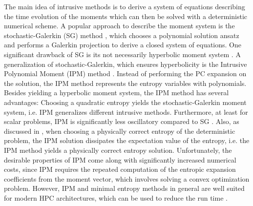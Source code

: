 The main idea of intrusive methods is to derive a system of equations describing the time evolution of the moments which can then be solved with a deterministic numerical scheme. A popular approach to describe the moment system is the stochastic-Galerkin (SG) method \cite{ghanem2003stochastic}, which chooses a polynomial solution ansatz and performs a Galerkin projection to derive a closed system of equations. One significant drawback of SG is its not necessarily hyperbolic moment system \cite{poette2009uncertainty}. A generalization of stochastic-Galerkin, which ensures hyperbolicity is the Intrusive Polynomial Moment (IPM) method \cite{poette2009uncertainty}. Instead of performing the PC expansion on the solution, the IPM method represents the entropy variables with polynomials. Besides yielding a hyperbolic moment system, the IPM method has several advantages: Choosing a quadratic entropy yields the stochastic-Galerkin moment system, i.e. IPM generalizes different intrusive methods. Furthermore, at least for scalar problems, IPM is significantly less oscillatory compared to SG \cite{kusch2017maximum}. Also, as discussed in \cite{poette2009uncertainty}, when choosing a physically correct entropy of the deterministic problem, the IPM solution dissipates the expectation value of the entropy, i.e. the IPM method yields a physically correct entropy solution. Unfortunately, the desirable properties of IPM come along with significantly increased numerical costs, since IPM requires the repeated computation of the entropic expansion coefficients from the moment vector, which involves solving a convex optimization problem. However, IPM and minimal entropy methods in general are well suited for modern HPC architectures, which can be used to reduce the run time \cite{garrett2015optimization}. 

